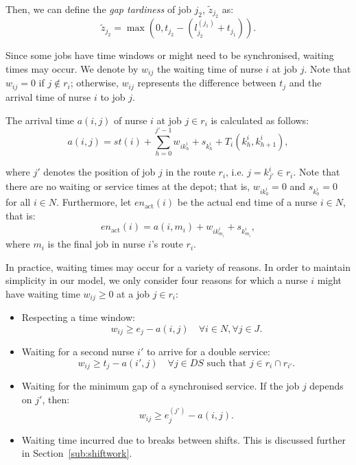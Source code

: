 \documentclass[a4paper,11pt,authoryear]{elsarticle}
\begin{document}
\noindent Then, we can define the \emph{gap tardiness} of job $j_2$, $\tilde{z}_{j_2}$ as:
\begin{equation}
    \tilde{z}_{j_2} = \max(0, t_{j_2} - (l^{(j_1)}_{j_2} + t_{j_1})). \label{eq:gaptardiness}
\end{equation}

\noindent Since some jobs have time windows or might need to be synchronised, waiting times may occur. We denote by $w_{ij}$ the waiting time of nurse $i$ at job $j$. Note that $w_{ij} = 0$ if $j \notin r_i$; otherwise, $w_{ij}$ represents the difference between $t_j$ and the arrival time of nurse $i$ to job $j$.%

The arrival time $a(i,j)$ of nurse $i$ at job $j \in r_i$ is calculated as follows:
\begin{equation}
    a(i,j) = st(i) + \sum_{h=0}^{j' - 1} w_{ik^i_h} + s_{k^i_h} + T_i(k^i_h, k^i_{h + 1}), \label{eq:arrivaltime}
\end{equation}

\noindent where $j'$ denotes the position of job $j$ in the route $r_i$, i.e. $j = k^i_{j'} \in r_i$. Note that there are no waiting or service times at the depot; that is, $w_{ik^i_0} = 0$ and $s_{k^i_0} = 0 $ for all $i \in N$. Furthermore, let $en_{\text{act}}(i)$ be the actual end time of a nurse $i \in N$, that is:
\begin{equation}
	en_{\text{act}}(i) = a(i,m_i) + w_{ik_{m_i}^i} + s_{k_{m_i}^i}, \label{eq:actualendtime}
\end{equation}
where $m_i$ is the final job in nurse $i$'s route $r_i$.

In practice, waiting times may occur for a variety of reasons. In order to maintain simplicity in our model, we only consider four reasons for which a nurse $i$ might have waiting time $w_{ij} \geq 0$ at a job $j \in r_i$:
\begin{itemize}
    \item Respecting a time window: 
    \begin{equation}
        w_{ij} \geq e_j - a(i,j) \quad \forall i \in N, \forall j \in J. \label{eq:waiting1TW}
    \end{equation}
    \item Waiting for a second nurse $i'$ to arrive for a double service:
    \begin{equation}
        w_{i j} \geq t_j - a(i',j) \quad \forall j \in DS \text{ such that } j \in r_{i} \cap r_{i'}. \label{eq:waiting2DS}
    \end{equation}
    \item Waiting for the minimum gap of a synchronised service. If the job $j$ depends on $j'$, then:
    \begin{equation}\label{eq:waiting3dependent}
        w_{ij} \geq e^{(j')}_{j} - a(i,j).
    \end{equation}
	\item Waiting time incurred due to breaks between shifts. This is discussed further in Section~\ref{sub:shiftwork}.
\end{itemize}
\end{document}
